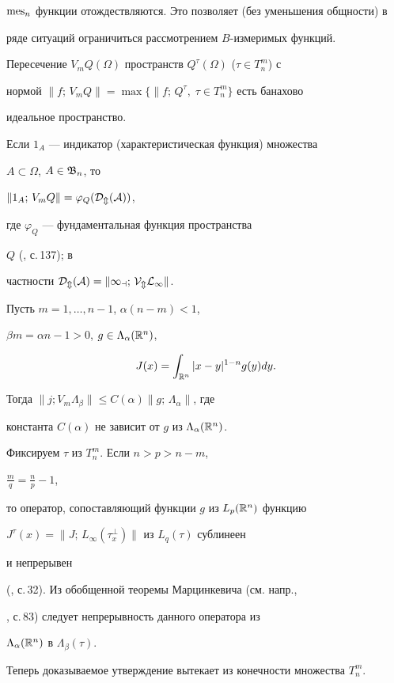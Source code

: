 $\operatorname{mes}_n$ функции отождествляются. Это позволяет (без уменьшения общности) в 


ряде ситуаций ограничиться рассмотрением $B$-измеримых функций. 


 


Пересечение $V_mQ(\Omega)$ пространств $Q^\tau(\Omega)$ ($\tau\in T^m_n$) с 


нормой $\|f;\,V_mQ\|=\max\{\|f;\,Q^\tau,\;\tau\in T^m_n\}$ есть банахово 


идеальное пространство. 


Если $1_A$ --- индикатор (характеристическая функция) множества 


$A\subset\Omega$, $A\in\frak B_n$, то 


$\|1_A;\,V_mQ\|=\varphi_Q(\cal D_m(A))$, 


где $\varphi_Q$ --- фундаментальная функция пространства 


$Q$ (\cite{Kre}, с.\,137); в 


частности $\cal D_m(A)=\|1_a;\,V_mL_1\|$. 


 




\begin{lem} Пусть $m=1,\dotsc,n-1$, $\alpha(n-m)<1$, 


$\beta m=\alpha n-1>0$, $g\in\Lambda_\alpha(\Bbb R^n)$, 


$$ 


J(x)=\int_{\Bbb R^n}|x-y|^{1-n}g(y)dy. 


$$ 


Тогда $\|j;V_m\Lambda_\beta\|\le C(\alpha)\|g;\,\Lambda_\alpha\|$, где 


константа $C(\alpha)$ не зависит от $g$ из $\Lambda_\alpha(\Bbb R^n)$. 


\end{lem} 


 


\begin{pf} Фиксируем $\tau$ из $T^m_n$. Если $n>p>n-m$, 


$\frac{m}{q}=\frac{n}{p}-1$, 


то оператор, сопоставляющий функции $g$ из $L_p(\Bbb R^n)$ функцию 


$J^\tau(x)=\|J;\,L_\infty(\tau_x^\perp)\|$ из $L_q(\tau)$ сублинеен 


и непрерывен 


(\cite{Bes}, с.\,32). Из обобщенной теоремы Марцинкевича (см. напр., 


\cite{Bru}, с.\,83) следует непрерывность данного оператора из 


$\Lambda_\alpha(\Bbb R^n)$ в $\Lambda_\beta(\tau)$. 


Теперь доказываемое утверждение вытекает из конечности множества $T^m_n$. 


\end{pf} 


